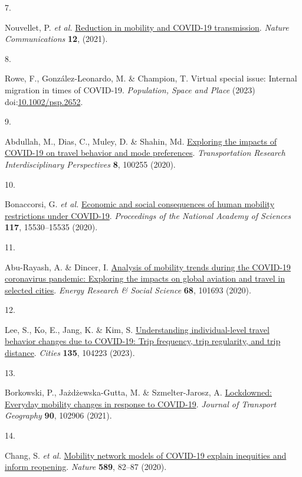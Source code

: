 \documentclass[
  11pt,
]{article}
\newlength{\cslhangindent}
\newlength{\csllabelwidth}
\newenvironment{CSLReferences}[2] %
 {\begin{list}{}{%
  \setlength{\itemindent}{0pt}
  \setlength{\leftmargin}{0pt}
  \setlength{\parsep}{0pt}
  \ifodd #1
   \setlength{\leftmargin}{\cslhangindent}
   \setlength{\itemindent}{-1\cslhangindent}
  \fi
  \setlength{\itemsep}{#2\baselineskip}}}
 {\end{list}}
\newcommand{\CSLLeftMargin}[1]{\parbox[t]{\csllabelwidth}{\strut#1\strut}}
\newcommand{\CSLRightInline}[1]{\parbox[t]{\linewidth - \csllabelwidth}{\strut#1\strut}}
\begin{document}
\begin{CSLReferences}{0}{0}
\CSLLeftMargin{7. }%
\CSLRightInline{Nouvellet, P. \emph{et al.}
\href{https://doi.org/10.1038/s41467-021-21358-2}{Reduction in mobility
and COVID-19 transmission}. \emph{Nature Communications} \textbf{12},
(2021).}

\CSLLeftMargin{8. }%
\CSLRightInline{Rowe, F., González-Leonardo, M. \& Champion, T. Virtual
special issue: Internal migration in times of COVID{-}19.
\emph{Population, Space and Place} (2023)
doi:\href{https://doi.org/10.1002/psp.2652}{10.1002/psp.2652}.}

\CSLLeftMargin{9. }%
\CSLRightInline{Abdullah, M., Dias, C., Muley, D. \& Shahin, Md.
\href{https://doi.org/10.1016/j.trip.2020.100255}{Exploring the impacts
of COVID-19 on travel behavior and mode preferences}.
\emph{Transportation Research Interdisciplinary Perspectives}
\textbf{8}, 100255 (2020).}

\CSLLeftMargin{10. }%
\CSLRightInline{Bonaccorsi, G. \emph{et al.}
\href{https://doi.org/10.1073/pnas.2007658117}{Economic and social
consequences of human mobility restrictions under COVID-19}.
\emph{Proceedings of the National Academy of Sciences} \textbf{117},
15530--15535 (2020).}

\CSLLeftMargin{11. }%
\CSLRightInline{Abu-Rayash, A. \& Dincer, I.
\href{https://doi.org/10.1016/j.erss.2020.101693}{Analysis of mobility
trends during the COVID-19 coronavirus pandemic: Exploring the impacts
on global aviation and travel in selected cities}. \emph{Energy Research
\& Social Science} \textbf{68}, 101693 (2020).}

\CSLLeftMargin{12. }%
\CSLRightInline{Lee, S., Ko, E., Jang, K. \& Kim, S.
\href{https://doi.org/10.1016/j.cities.2023.104223}{Understanding
individual-level travel behavior changes due to COVID-19: Trip
frequency, trip regularity, and trip distance}. \emph{Cities}
\textbf{135}, 104223 (2023).}

\CSLLeftMargin{13. }%
\CSLRightInline{Borkowski, P., Jażdżewska-Gutta, M. \& Szmelter-Jarosz,
A. \href{https://doi.org/10.1016/j.jtrangeo.2020.102906}{Lockdowned:
Everyday mobility changes in response to COVID-19}. \emph{Journal of
Transport Geography} \textbf{90}, 102906 (2021).}

\CSLLeftMargin{14. }%
\CSLRightInline{Chang, S. \emph{et al.}
\href{https://doi.org/10.1038/s41586-020-2923-3}{Mobility network models
of COVID-19 explain inequities and inform reopening}. \emph{Nature}
\textbf{589}, 82--87 (2020).}


\end{CSLReferences}
\end{document}
